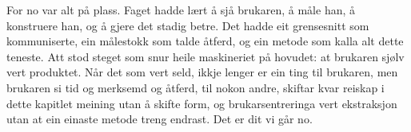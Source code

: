 \vignett

For no var alt på plass. Faget hadde lært å sjå brukaren, å måle han, å konstruere han, og å gjere det stadig betre. Det hadde eit grensesnitt som kommuniserte, ein målestokk som talde åtferd, og ein metode som kalla alt dette teneste. Att stod steget som snur heile maskineriet på hovudet: at brukaren sjølv vert produktet. Når det som vert seld, ikkje lenger er ein ting til brukaren, men brukaren si tid og merksemd og åtferd, til nokon andre, skiftar kvar reiskap i dette kapitlet meining utan å skifte form, og brukarsentreringa vert ekstraksjon utan at ein einaste metode treng endrast. Det er dit vi går no.

